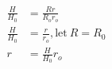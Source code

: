 \documentclass[12pt]{article}
\begin{document}
\begin{align*}
\frac{H}{H_0} &= \frac{Rr}{R_or_o}\\
\frac{H}{H_0} &= \frac{r}{r_o}, \text{let}\ R = R_0\\
r &= \frac{H}{H_0} r_o
\end{align*}
\end{document}
